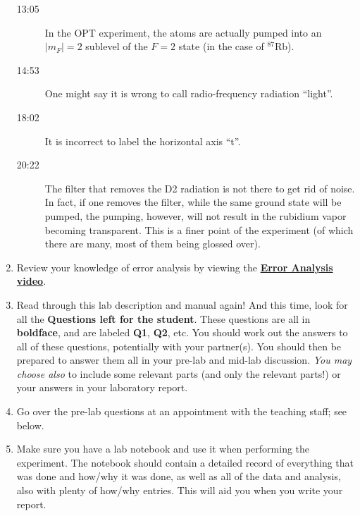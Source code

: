 \documentclass{../lab}
\begin{document}
\begin{enumerate}
\begin{description}
        \item [13:05] In the OPT experiment, the atoms are actually pumped into an $|m_F|=2$ sublevel of the $F = 2$ state (in the case of $^{87}$Rb).

        \item [14:53] One might say it is wrong to call radio-frequency radiation ``light''.

        \item [18:02] It is incorrect to label the horizontal axis ``t''.

        \item [20:22] The filter that removes the D2 radiation is not there to get rid of noise. In fact, if one removes the filter, while the same ground state will be pumped, the pumping, however, will not result in the rubidium vapor becoming transparent. This is a finer point of the experiment (of which there are many, most of them being glossed over).
    \end{description}

\item{} Review your knowledge of error analysis by viewing the \href{\ErrorAnalysisVideo}{\textbf{Error Analysis video}}.

\item{} Read through this lab description and manual again!  And this time, look for all the \textbf{Questions left for the student}.   These questions are all in \textbf{boldface}, and are labeled \textbf{Q1}, \textbf{Q2}, etc. You should work out the answers to all of these questions, potentially with your partner(s).  You should then be prepared to answer them all in your pre-lab and mid-lab discussion.  \emph{You may choose also} to include some relevant parts (and only the relevant parts!) or your answers in your laboratory report.


\item{} Go over the pre-lab questions at an appointment with the teaching staff; see below.

\item{} Make sure you have a lab notebook and use it when performing the experiment. The notebook should contain a detailed record of everything that was done and how/why it was done, as well as all of the data and analysis, also with plenty of how/why entries. This will aid you when you write your report.


\end{enumerate}


\end{document}
